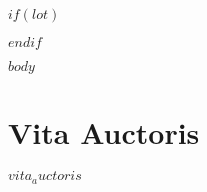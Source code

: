 \documentclass[phdthesis,12pt,final]{wuthesis}
\begin{document}
$if(lot)$
\cleardoublepage
{}
{}
\begin{center}
\end{center}
\vspace{1em}
\begin{singlespace}
\listoftables
\end{singlespace}
$endif$

\listoffigures

\cleardoublepage
\begin{singlespace}
  \renewcommand\contentsname{\chapter*{Table of Contents}}
\tableofcontents
\end{singlespace}


\cleardoublepage
{}
\setcounter{page}{1}

$body$

\backmatter

\cleardoublepage
{}
{}
\chapter*{Vita Auctoris}
\begin{doublespace}
$vita_auctoris$
\end{doublespace}

\end{document}
